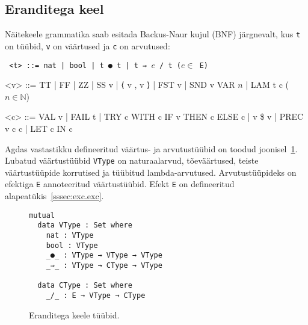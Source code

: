 \documentclass[a4paper,12pt]{article}
\begin{document}
\subsection{Eranditega keel}\label{ssec:exc.raw}

Näitekeele grammatika saab esitada Backus-Naur kujul (BNF) järgnevalt, kus {\tt t} on tüübid, {\tt v} on väärtused ja {\tt c} on arvutused:
\begin{adjustwidth}{1em}{0pt}
\begin{grammar}\tt
<t> ::= nat | bool | t ● t | t ⇒ $e$ / t \hfill ($e \in$ E)
  
<v> ::= TT | FF | ZZ | SS v | ⟨ v , v ⟩ | FST v | SND v
    \alt VAR $n$ | LAM t c \hfill ($n \in \mathbb N$)
  
<c> ::= VAL v | FAIL t | TRY c WITH c
    \alt IF v THEN c ELSE c | v \$ v | PREC v c c | LET c IN c
\end{grammar}
\end{adjustwidth}
Agdas vastastikku defineeritud väärtus- ja arvutustüübid on toodud joonisel~\ref{fig:exc.types}.
Lubatud väärtustüübid {\tt VType} on naturaalarvud, tõeväärtused, teiste väärtustüüpide korrutised ja tüübitud lambda-arvutused.
Arvutustüüpideks on efektiga {\tt E} annoteeritud väärtustüübid. Efekt {\tt E} on defineeritud alapeatükis~\ref{sssec:exc.exc}.
\begin{figure}
  \begin{BVerbatim}
mutual
  data VType : Set where
    nat : VType
    bool : VType
    _●_ : VType → VType → VType
    _⇒_ : VType → CType → VType

  data CType : Set where
    _/_ : E → VType → CType
  \end{BVerbatim}
  \caption{Eranditega keele tüübid.}
  \label{fig:exc.types}
\end{figure}
\end{document}
